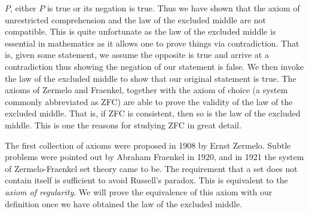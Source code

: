     $P$, either $P$ is true or its negation is true. Thus we have shown that the
    axiom of unrestricted comprehension and the law of the excluded middle are
    not compatible. This is quite unfortunate as the law of the excluded middle
    is essential in mathematics as it allows one to prove things via
    contradiction. That is, given some statement, we assume the opposite is true
    and arrive at a contradiction thus showing the negation of our statement is
    false. We then invoke the law of the excluded middle to show that our
    original statement is true. The axioms of Zermelo and Fraenkel, together
    with the axiom of choice (a system commonly abbreviated as ZFC) are able to
    prove the validity of the law of the excluded middle. That is, if ZFC is
    consistent, then so is the law of the excluded middle. This is one the
    reasons for studying ZFC in great detail.
    \par\hfill\par
    The first collection of axioms were proposed in 1908 by Ernst Zermelo.
    Subtle problems were pointed out by Abraham Fraenkel in 1920, and in 1921
    the system of Zermelo-Fraenkel set theory came to be. The requirement that a
    set does not contain itself is sufficient to avoid Russell's paradox. This
    is equivalent to the \textit{axiom of regularity}. We will prove the
    equivalence of this axiom with our definition once we have obtained the law
    of the excluded middle.
